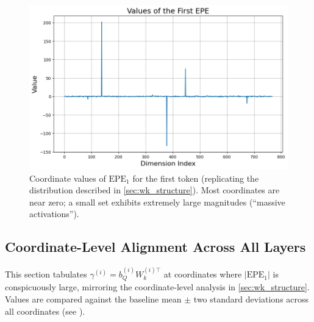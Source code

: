 \documentclass[11pt]{article}
\begin{document}
\begin{figure}[t]
  \includegraphics[width=\columnwidth]{figures/massive_activations_in_ppe.png}
  \caption{Coordinate values of $\mathrm{EPE}_1$ for the first token (replicating the distribution described in \cref{sec:wk_structure}). Most coordinates are near zero; a small set exhibits extremely large magnitudes (``massive activations'').}
  \label{fig:appendix_massive_activations}
\end{figure}

\subsection{Coordinate-Level Alignment Across All Layers} \label{app:coor_align}

This section tabulates $\gamma^{(i)}=b_Q^{(i)}W_k^{(i)\top}$ at coordinates where $|\mathrm{EPE}_1|$ is conspicuously large, mirroring the coordinate-level analysis in \cref{sec:wk_structure}. Values are compared against the baseline mean $\pm$ two standard deviations across all coordinates (see ).
\end{document}
